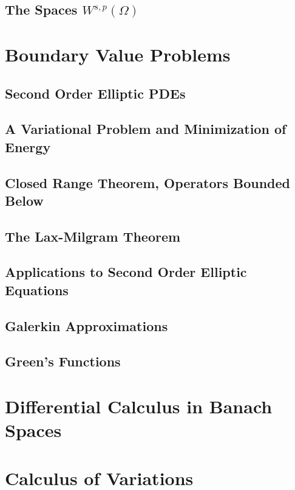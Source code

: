 \documentclass[letterpaper,twoside,12pt]{article}
\theoremstyle{mystyle}
\begin{document}
\subsection{The Spaces $W^{s, p}\left( \Omega \right)$}

\newpage\section{Boundary Value Problems}
\subsection{Second Order Elliptic PDEs}
\subsection{A Variational Problem and Minimization of Energy}
\subsection{Closed Range Theorem, Operators Bounded Below}
\subsection{The Lax-Milgram Theorem}
\subsection{Applications to Second Order Elliptic Equations}
\subsection{Galerkin Approximations}
\subsection{Green's Functions}

\newpage\section{Differential Calculus in Banach Spaces}
\newpage\section{Calculus of Variations }
\end{document}
